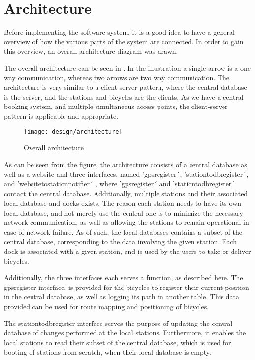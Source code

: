 \section{Architecture}
Before implementing the software system, it is a good idea to have a general overview of how the various parts of the system are connected.
In order to gain this overview, an overall architecture diagram was drawn.

The overall architecture can be seen in .
In the illustration a single arrow is a one way communication, whereas two arrows are two way communication.
The architecture is very similar to a client-server pattern, where the central database is the server, and the stations and bicycles are the clients.
As we have a central booking system, and multiple simultaneous access points, the client-server pattern is applicable and appropriate.

\begin{figure}[h]
	\centering
	\texttt{[image: design/architecture]}
	\caption{Overall architecture}\label{fig:overallarch}
\end{figure}

As can be seen from the figure, the architecture consists of a central database as well as a website and three interfaces, named 'gpsregister´, 'stationtodbregister´, and 'websitetostationnotifier´ , where 'gpsregister´ and 'stationtodbregister´ contact the central database.
Additionally, multiple stations and their associated local database and docks exists.
The reason each station needs to have its own local database, and not merely use the central one is to minimize the necessary network communication, as well as allowing the stations to remain operational in case of network failure.
As of such, the local databases contains a subset of the central database, corresponding to the data involving the given station.
Each dock is associated with a given station, and is used by the users to take or deliver bicycles.

Additionally, the three interfaces each serves a function, as described here.
The gpsregister interface, is provided for the bicycles to register their current position in the central database, as well as logging its path in another table.
This data provided can be used for route mapping and positioning of bicycles.

The stationtodbregister interface serves the purpose of updating the central database of changes performed at the local stations. Furthermore, it enables the local stations to read their subset of the central database, which is used for booting of stations from scratch, when their local database is empty.

